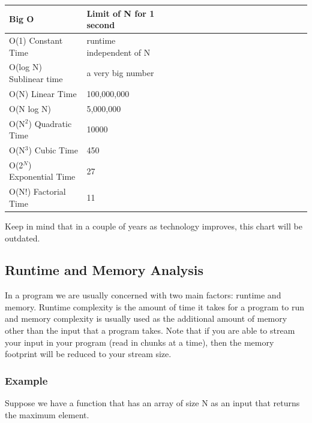 \documentclass[11pt,oneside]{book}
\begin{document}
\begin{center}\begin{tabulary}{0.4\linewidth}{|l|l|l|l|l|l|l|l|l|l|l|l|l|l|l|l|l|l|l}\hline


  Big O &
  Limit of N for 1 second\\
\hline


  O(1) Constant Time &
  runtime independent of N\\

  O(log N) Sublinear time &
  a very big number\\

  O(N) Linear Time &
  100,000,000\\

  O(N log N) &
  5,000,000\\

  O(N$^{2}$) Quadratic Time &
  10000\\

  O(N$^{3}$) Cubic Time &
  450\\

  O(2$^{N}$) Exponential Time &
  27\\

  O(N!) Factorial Time &
  11\\

\hline\end{tabulary}\end{center}

Keep in mind that in a couple of years as technology improves, this chart will be outdated.

\subsection{Runtime and Memory Analysis}

In a program we are usually concerned with two main factors: runtime and memory. Runtime complexity is the amount of time it takes for a program to run and memory complexity is usually used as the additional amount of memory other than the input that a program takes. Note that if you are able to stream your input in your program (read in chunks at a time), then the memory footprint will be reduced to your stream size.

\subsubsection{Example}

Suppose we have a function that has an array of size N as an input that returns the maximum element.
\end{document}
